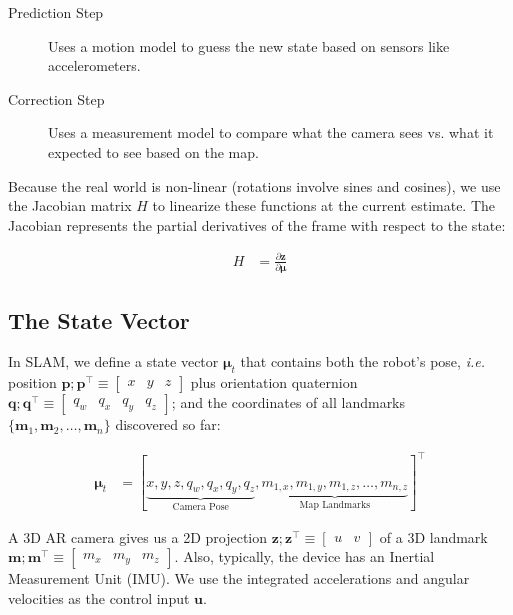 \documentclass[11pt]{article}
\begin{document}
\begin{description}
\item[{Prediction Step}] Uses a motion model to guess the
new state based on sensors like accelerometers.
\item[{Correction Step}] Uses a measurement model to
compare what the camera sees vs. what it expected to
see based on the map.
\end{description}

Because the real world is non-linear (rotations involve
sines and cosines), we use the Jacobian matrix \(H\) to
linearize these functions at the current estimate.  The
Jacobian represents the partial derivatives of the
frame with respect to the state:

\begin{align*}
  H &= \frac{\partial \mathbf{z}} {\partial
      \boldsymbol{\mu}}
\end{align*}
\subsection{The State Vector}
\label{sec:state-vector}
In SLAM, we define a state vector \(\boldsymbol{\mu}_t\)
that contains both the robot's pose, \emph{i.e.} position
\(\mathbf{p}; \mathbf{p}^{\top} \equiv \begin{bmatrix} x
& y & z \end{bmatrix}\)
 plus orientation quaternion
\(\mathbf{q}; \mathbf{q}^{\top} \equiv \begin{bmatrix}
q_w&q_x&q_y&q_z \end{bmatrix}\); and the coordinates of
all landmarks \(\{\mathbf{m}_1, \mathbf{m}_2, \dots, \mathbf{m}_n\}\) discovered so
far:

\begin{align*}
  \boldsymbol{\mu}_t
  &= \left[ \underbrace{x, y, z,
q_w, q_x, q_y, q_z}_{\text{Camera Pose}},
\underbrace{m_{1,x}, m_{1,y}, m_{1,z}, \dots,
m_{n,z}}_{\text{Map Landmarks}} \right]^{\top}
\end{align*}

A 3D AR camera gives us a 2D projection \(\mathbf{z};
\mathbf{z}^{\top} \equiv \begin{bmatrix} u & v
\end{bmatrix}\) of a 3D landmark \(\mathbf{m};
\mathbf{m}^{\top} \equiv \begin{bmatrix} m_x&m_y&m_z
\end{bmatrix}\).  Also, typically, the device has an
Inertial Measurement Unit (IMU).  We use the integrated
accelerations and angular velocities as the control
input \(\mathbf{u}\).
\end{document}
